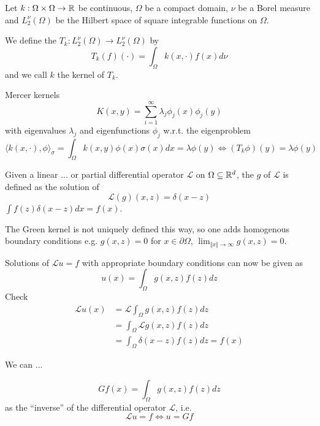 \begin{definition}\label{def:48}
    Let $k:\Omega\times\Omega\to\mathbb{R}$ be continuous, $\Omega$ be a compact domain,
    $\nu$ be a Borel measure and $L_2^{\nu}(\Omega)$ be the Hilbert space of square integrable functions on $\Omega$.
    
    We define the  $T_k:L_2^\nu(\Omega)\to L_2^\nu(\Omega)$ by 
    \[T_k(f)(\cdot)=\int_\Omega k(x,\cdot)f(x)d\nu\]
    and we call $k$ the kernel of $T_k$.
\end{definition}

Mercer kernels 
\[K(x,y)=\sum_{i=1}^\infty \lambda_j\phi_j(x)\phi_j(y)\]
with eigenvalues $\lambda_j$ and eigenfunctions $\phi_j$ w.r.t. the eigenproblem
\[\langle k(x,\cdot),\phi\rangle_\sigma=\int_\Omega k(x,y)\phi(x)\sigma(x)dx=\lambda\phi(y)\iff (T_k\phi)(y)=\lambda\phi(y)\]
\begin{definition}\label{def:49}
    Given a linear ... or partial differential operator $\mathcal{L}$ on $\Omega\subseteq\mathbb{R}^d$, the %
     $g$ of $\mathcal{L}$ is defined as the solution of 
    \[\mathcal{L}(g)(x,z)=\delta(x-z)\]
    $\int f(z)\delta(x-z)dx=f(x)$.
\end{definition}

The Green kernel is not uniquely defined this way, so one adds 
homogenous boundary conditions e.g. $g(x,z)=0$ for $x\in\partial\Omega$,
$\lim_{\Vert x\Vert \to\infty} g(x,z)=0$.

Solutions of $\mathcal{L}u=f$ with appropriate boundary conditions can 
now be given as 
\[u(x)=\int_\Omega g(x,z)f(z)dz\]
Check 
\begin{align*}
    \mathcal{L}u(x)&=\mathcal{L}\int_\Omega g(x,z)f(z)dz\\
    &=\int_\Omega \mathcal{L}g(x,z)f(z)dz\\
    &=\int_\Omega \delta(x-z)f(z)dz=f(x)
\end{align*}

We can ... %

\[Gf(x)=\int_\Omega g(x,z)f(z)dz\]
as the ``inverse'' of the differential operator $\mathcal{L}$, i.e.
\[\mathcal{L}u=f\iff u=Gf\]

